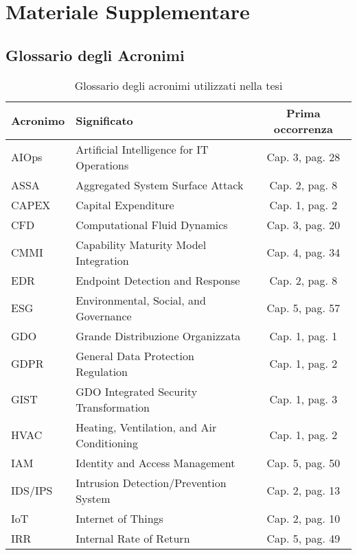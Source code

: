 
\chapter{\texorpdfstring{Materiale Supplementare}{Appendice D - Materiale Supplementare}}
\label{app:supplementare}

\section{\texorpdfstring{Glossario degli Acronimi}{D.1 - Glossario degli Acronimi}}

\begin{table}[htbp]
\centering
\caption{Glossario degli acronimi utilizzati nella tesi}
\label{tab:glossario}
\begin{tabular}{llc}
\toprule
\textbf{Acronimo} & \textbf{Significato} & \textbf{Prima occorrenza} \\
\midrule
AIOps & Artificial Intelligence for IT Operations & Cap. 3, pag. 28 \\
ASSA & Aggregated System Surface Attack & Cap. 2, pag. 8 \\
CAPEX & Capital Expenditure & Cap. 1, pag. 2 \\
CFD & Computational Fluid Dynamics & Cap. 3, pag. 20 \\
CMMI & Capability Maturity Model Integration & Cap. 4, pag. 34 \\
EDR & Endpoint Detection and Response & Cap. 2, pag. 8 \\
ESG & Environmental, Social, and Governance & Cap. 5, pag. 57 \\
GDO & Grande Distribuzione Organizzata & Cap. 1, pag. 1 \\
GDPR & General Data Protection Regulation & Cap. 1, pag. 2 \\
GIST & GDO Integrated Security Transformation & Cap. 1, pag. 3 \\
HVAC & Heating, Ventilation, and Air Conditioning & Cap. 1, pag. 2 \\
IAM & Identity and Access Management & Cap. 5, pag. 50 \\
IDS/IPS & Intrusion Detection/Prevention System & Cap. 2, pag. 13 \\
IoT & Internet of Things & Cap. 2, pag. 10 \\
IRR & Internal Rate of Return & Cap. 5, pag. 49 \\

\end{tabular}
\end{table}
